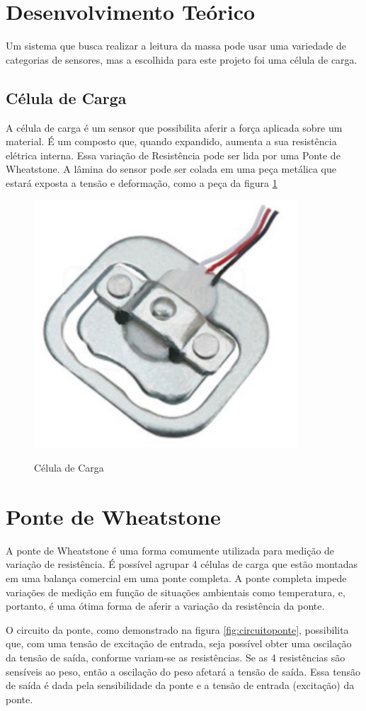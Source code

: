 \documentclass[a4paper, 12pt]{article}
\begin{document}
	\section{Desenvolvimento Teórico}
	Um sistema que busca realizar a leitura da massa pode usar uma variedade de categorias de sensores, mas a escolhida para este projeto foi uma célula de carga.
	
	\subsection{Célula de Carga}
	
	A célula de carga é um sensor que possibilita aferir a força aplicada sobre um material. É um composto que, quando expandido, aumenta a sua resistência elétrica interna. Essa variação de Resistência pode ser lida por uma Ponte de Wheatstone. A lâmina do sensor pode ser colada em uma peça metálica que estará exposta a tensão e deformação, como a peça da figura \ref{fig:celuladecarga}
	
	\begin{figure}[!htb]
		\centering
		\caption{Célula de Carga}
		\includegraphics[width=.4\linewidth]{celuladecarga}
		\label{fig:celuladecarga}
	\end{figure}
	
	\section{Ponte de Wheatstone}
	
	A ponte de Wheatstone é uma forma comumente utilizada para medição de variação de resistência. É possível agrupar 4 células de carga que estão montadas em uma balança comercial em uma ponte completa. A ponte completa impede variações de medição em função de situações ambientais como temperatura, e, portanto, é uma ótima forma de aferir a variação da resistência da ponte. 
	
	O circuito da ponte, como demonstrado na figura \ref{fig:circuitoponte}, possibilita que, com uma tensão de excitação de entrada, seja possível obter uma oscilação da tensão de saída, conforme variam-se as resistências. Se as 4 resistências são sensíveis ao peso, então a oscilação do peso afetará a tensão de saída. Essa tensão de saída é dada pela sensibilidade da ponte e a tensão de entrada (excitação) da ponte.
	
\end{document}

